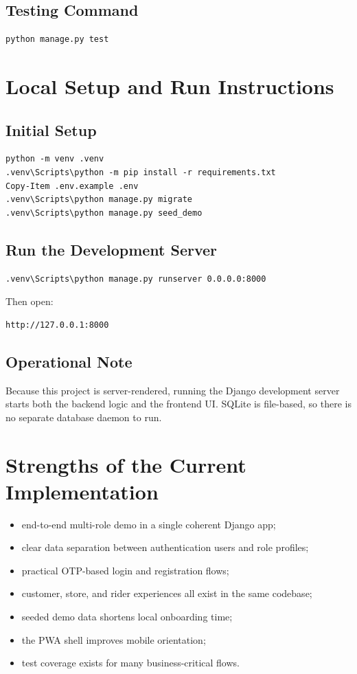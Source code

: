 \documentclass[12pt,a4paper]{article}
\begin{document}
\subsection{Testing Command}
\begin{lstlisting}[style=plaincode]
python manage.py test
\end{lstlisting}

\section{Local Setup and Run Instructions}
\subsection{Initial Setup}
\begin{lstlisting}[style=plaincode]
python -m venv .venv
.venv\Scripts\python -m pip install -r requirements.txt
Copy-Item .env.example .env
.venv\Scripts\python manage.py migrate
.venv\Scripts\python manage.py seed_demo
\end{lstlisting}

\subsection{Run the Development Server}
\begin{lstlisting}[style=plaincode]
.venv\Scripts\python manage.py runserver 0.0.0.0:8000
\end{lstlisting}

Then open:
\begin{lstlisting}[style=plaincode]
http://127.0.0.1:8000
\end{lstlisting}

\subsection{Operational Note}
Because this project is server-rendered, running the Django development server starts both the backend logic and the frontend UI. SQLite is file-based, so there is no separate database daemon to run.

\section{Strengths of the Current Implementation}
\begin{itemize}[leftmargin=1.5em]
    \item end-to-end multi-role demo in a single coherent Django app;
    \item clear data separation between authentication users and role profiles;
    \item practical OTP-based login and registration flows;
    \item customer, store, and rider experiences all exist in the same codebase;
    \item seeded demo data shortens local onboarding time;
    \item the PWA shell improves mobile orientation;
    \item test coverage exists for many business-critical flows.
\end{itemize}
\end{document}

